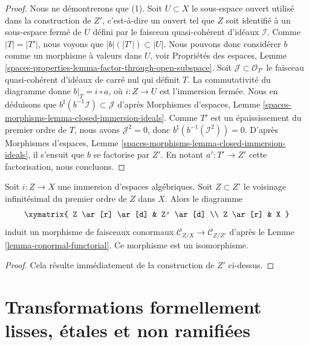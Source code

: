 \begin{proof}
Nous ne démontrerons que (1).
Soit $U \subset X$ le sous-espace ouvert utilisé dans la construction de $Z'$,
c'est-à-dire un ouvert tel que $Z$ soit identifié à un sous-espace fermé de $U$
défini par le faisceau quasi-cohérent d'idéaux $\mathcal{I}$.
Comme $|T| = |T'|$, nous voyons que $|b|(|T'|) \subset |U|$. Nous pouvons donc
considérer $b$ comme un morphisme à valeurs dans $U$, voir
Propriétés des espaces,
Lemme \ref{spaces-properties-lemma-factor-through-open-subspace}.
Soit $\mathcal{J} \subset \mathcal{O}_{T'}$
le faisceau quasi-cohérent d'idéaux de carré nul qui définit $T$.
La commutativité du diagramme donne $b|_T = i \circ a$, où
$i : Z \to U$ est l'immersion fermée. Nous en déduisons que
$b^\sharp(b^{-1}\mathcal{I}) \subset \mathcal{J}$ d'après
Morphismes d'espaces,
Lemme \ref{spaces-morphisms-lemma-closed-immersion-ideals}.
Comme $T'$ est un épaississement du premier ordre de $T$, nous avons $\mathcal{J}^2 = 0$,
donc $b^\sharp(b^{-1}(\mathcal{I}^2)) = 0$. D'après
Morphismes d'espaces, Lemme \ref{spaces-morphisms-lemma-closed-immersion-ideals},
il s'ensuit que $b$ se factorise par $Z'$. En notant $a' : T' \to Z'$
cette factorisation, nous concluons.
\end{proof}

\begin{lemma}
\label{lemma-infinitesimal-neighbourhood-conormal}
Soit $i : Z \to X$ une immersion d'espaces algébriques.
Soit $Z \subset Z'$ le voisinage infinitésimal du premier ordre
de $Z$ dans $X$. Alors le diagramme
$$
\xymatrix{
Z \ar[r] \ar[d] & Z' \ar[d] \\
Z \ar[r] & X
}
$$
induit un morphisme de faisceaux conormaux
$\mathcal{C}_{Z/X} \to \mathcal{C}_{Z/Z'}$ d'après le
Lemme \ref{lemma-conormal-functorial}.
Ce morphisme est un isomorphisme.
\end{lemma}

\begin{proof}
Cela résulte immédiatement de la construction de $Z'$ ci-dessus.
\end{proof}





\section{Transformations formellement lisses, étales et non ramifiées}
\label{section-formally-smooth-etale-unramified}

